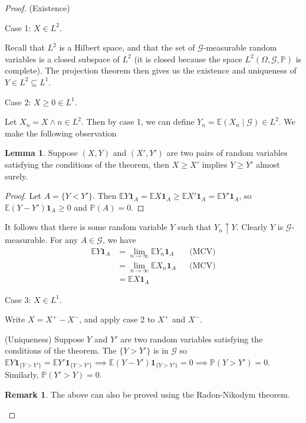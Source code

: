 \documentclass[parskip=full]{article}
\theoremstyle{definition}
\newtheorem{lemma}{Lemma}[theorem]
\newtheorem*{remark}{Remark}
\newcommand{\Pbb}{\mathbb{P}}
\newcommand{\1}{\mathbbm{1}}
\newcommand{\E}{\mathbb{E}}
\begin{document}
\begin{proof}(Existence)

Case 1: $X \in L^2$. 

Recall that $L^2$ is a Hilbert space, and that the set of $\mathcal{G}$-measurable random variables is a closed subspace of $L^2$ (it is closed because the space $L^2(\Omega, \mathcal{G}, \Pbb)$ is complete). The projection theorem then gives us the existence and uniqueness of $Y\in L^2 \subseteq L^1$.

Case 2: $X \geq 0 \in L^1$.

Let $X_n = X \wedge n \in L^2$. Then by case 1, we can define $Y_n = \E(X_n \mid \mathcal{G}) \in L^2$. We make the following observation

\begin{lemma}
Suppose $(X, Y)$ and $(X', Y')$ are two pairs of random variables satisfying the conditions of the theorem, then $X \geq X'$ implies $Y \geq Y'$ almost surely.
\end{lemma}

\begin{proof}
    Let $A = \{Y < Y'\}$. Then $\E Y \mathbf{1}_A = \E X \mathbf{1}_A \geq \E X' \mathbf{1}_A = \E Y' \mathbf{1}_A$, so $\E (Y - Y') \mathbf{1}_A \geq 0$ and $\Pbb(A) = 0$.
\end{proof}

It follows that there is some random variable $Y$ such that $Y_n \uparrow Y$. Clearly $Y$ is $\mathcal{G}$-measurable. For any $A \in \mathcal{G}$, we have
\begin{align*}
    \E Y \mathbf{1}_A &= \lim_{n \to \infty} \E Y_n \mathbf{1}_A &&\text{(MCV)}\\
    &= \lim_{n \to \infty} \E X_n \mathbf{1}_A &&\text{(MCV)}\\
    &= \E X \mathbf{1}_A
\end{align*}

Case 3: $X \in L^1$.

Write $X = X^+ - X^-$, and apply case 2 to $X^+$ and $X^-$.

(Uniqueness)
Suppose $Y$ and $Y'$ are two random variables satisfying the conditions of the theorem. The $\{Y > Y'\}$ is in $\mathcal{G}$ so $\E Y \mathbf{1}_{\{Y > Y'\}} = \E Y' \mathbf{1}_{\{Y > Y'\}} \implies \E (Y - Y') \mathbf{1}_{\{Y > Y'\}} = 0 \implies \Pbb(Y > Y') = 0$. Similarly, $\Pbb(Y' > Y) = 0$.


\begin{remark}
The above can also be proved using the Radon-Nikodym theorem.
\end{remark}


\end{proof}
\end{document}

